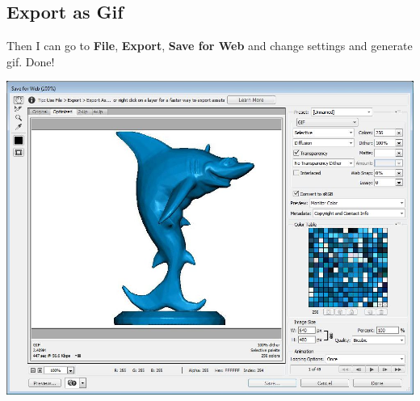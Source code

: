 \documentclass[10pt,a4paper]{article}
\begin{document}
\subsection{Export as Gif}
Then I can go to \textbf{File}, \textbf{Export}, \textbf{Save for Web} and change settings and generate gif. Done!
\begin{center}
\includegraphics[scale=0.3]{exportAsWeb}
\label{fig:exportAsWeb}
\end{center}

\end{document}
